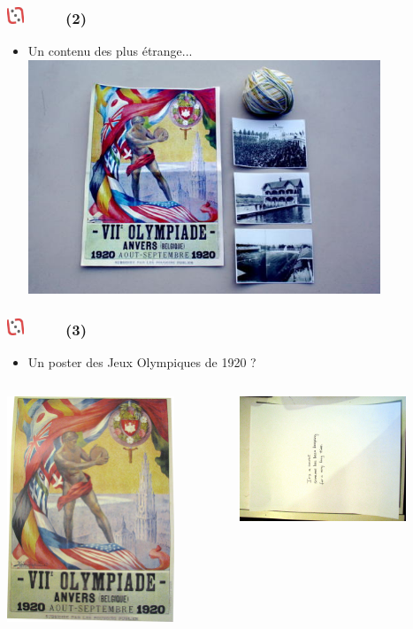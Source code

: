 \documentclass[slidetop,11pt]{beamer}
\def\moreInFrameTitleLeftt{\includegraphics[height=0.5cm]{img/ligueludique-0.png}~~~~~}
\begin{document}
\begin{frame}
	\frametitle{\moreInFrameTitleLeftt \sectionPartIIaIV  (2) }
	\begin{itemize}
		\item Un contenu des plus {\'e}trange...
		\includegraphics[height=7.00cm]{img/argTheLostRing/Fronts_and_string_540x359.jpg}
	\end{itemize}
\end{frame} 

\begin{frame}
	\frametitle{\moreInFrameTitleLeftt \sectionPartIIaIV  (3) }
	\begin{itemize}
		\item Un poster des Jeux Olympiques de 1920 ?
	\end{itemize}
	\begin{columns}[T]
		\begin{column}[T]{5.05cm}
			\includegraphics[width=5.00cm]{img/argTheLostRing/2298573863_8f55746c43_o.jpg}
		\end{column}
		\begin{column}[T]{5.05cm}
			\includegraphics[width=5.00cm]{img/argTheLostRing/2298573691_f5614cb457_o.jpg}
		\end{column}
	\end{columns}
\end{frame} 
\end{document}

